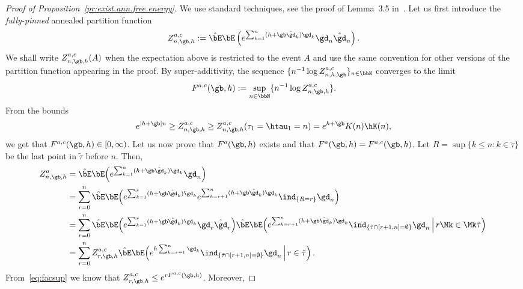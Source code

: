 \begin{proof}[Proof of Proposition~\ref{pr:exist.ann.free.energy}]
We use standard techniques, see the proof of Lem\-ma~3.5 in~\cite{Gi2011}. Let us first introduce the \emph{fully-pinned} annealed partition function
\begin{equation}\label{eq:fullpinned}
Z^{a, c}_{n,\gb,h} := \hat \bE \bE \left(e^{\sum_{k=1}^n (h + \gb \hat \gd_k) \gd_k} \gd_n \hat \gd_n \right).
\end{equation}
We shall write $Z^{a, c}_{n,\gb,h}(A)$ when the expectation above is restricted to the event $A$ and use the same convention for other versions of the partition function appearing in the proof. By super-additivity, the sequence $\{n^{-1} \log Z_{n,h,\gb}^{a,c}\}_{n \in \bbN}$ converges to the limit
\begin{equation}\label{eq:facsup}
F^{a, c}(\gb,h) := \sup_{n \in \bbN} \{n^{-1} \log Z^{a,c}_{n,\gb,h}\}.
\end{equation}
From the bounds
\begin{equation}
e^{|h + \gb| n} \geq Z^{a,c}_{n,\gb,h} \geq Z^{a,c}_{n,\gb,h}(\tau_1 = \htau_1 = n) = e^{h + \gb} K(n) \hK(n),
\end{equation}
we get that $F^{a,c}(\gb,h) \in [0,\infty)$. Let us now prove that $F^a(\gb,h)$ exists and that $F^a(\gb,h) = F^{a,c}(\gb,h)$. Let $R = \sup \{k \leq n \colon k\in \tilde\tau\}$ be the last point in $\tilde\tau$ before $n$. Then,
\begin{equation}
\begin{aligned}
\!\!\!Z^{a}_{n,\gb,h} &= \hat \bE \bE \!\left(e^{\sum_{k=1}^n (h + \gb \hat \gd_k) \gd_k} \gd_n \right)\\
&= \sum_{r=0}^n \hat \bE \bE \!\left(e^{\sum_{k=1}^r (h + \gb \hat \gd_k) \gd_k} e^{\sum_{k=r+1}^n (h + \gb \hat \gd_k) \gd_k} \ind_{\{R = r\}} \gd_n \right)\\
&= \sum_{r=0}^n \hat \bE \bE \!\left(e^{\sum_{k=1}^r (h + \gb \hat \gd_k) \gd_k} \gd_{r} \hat \gd_r \right) \!\hat \bE \bE\! \left(e^{\sum_{k=r+1}^n (h + \gb \hat \gd_k) \gd_k} \ind_{\{\tilde{\tau} \cap [r+1,n] = \emptyset\}} \gd_n \,\middle|\, r \Mk\in\Mk \tilde\tau \right)\!\!\\
&= \sum_{r=0}^n Z_{r,\gb,h}^{a,c} \hat \bE \bE \!\left(e^{h \sum_{k=r+1}^n \gd_k}\ind_{\{\tilde{\tau} \cap [r+1,n] = \emptyset\}} \gd_n \,\middle|\, r \in \tilde\tau \right).
\end{aligned}
\end{equation}
From~\eqref{eq:facsup} we know that $Z_{r,\gb,h}^{a,c} \leq e^{rF^{a,c}(\gb,h)}$. Moreover,

\end{proof}
